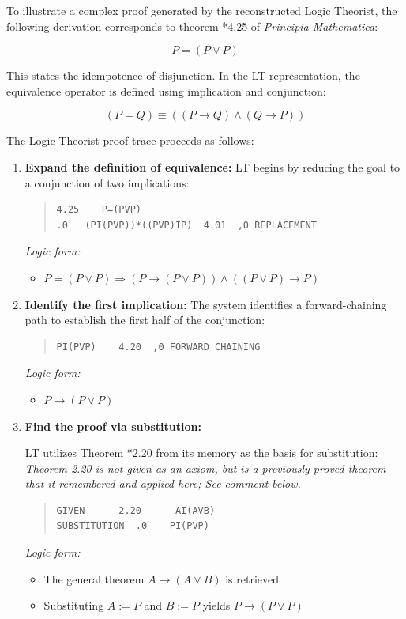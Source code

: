 \documentclass[journal]{IEEEtran}
\begin{document}
To illustrate a complex proof generated by the reconstructed Logic
Theorist, the following derivation corresponds to theorem *4.25 of
\textit{Principia Mathematica}:

\[ P = (P \lor P) \]

This states the idempotence of disjunction. In the LT representation,
the equivalence operator is defined using implication and conjunction:

\[ (P = Q) \equiv ((P \rightarrow Q) \land (Q \rightarrow P)) \]

The Logic Theorist proof trace proceeds as follows:

\begin{enumerate}

\item \textbf{Expand the definition of equivalence:}
LT begins by reducing the goal to a conjunction of two implications:
\begin{quote}
\begin{verbatim}
4.25    P=(PVP)
.0   (PI(PVP))*((PVP)IP)  4.01  ,0 REPLACEMENT
\end{verbatim}
\end{quote}
\textit{Logic form:}
\begin{itemize}
    \item[] $P = (P \lor P) \Rightarrow (P \rightarrow (P \lor P)) \land ((P \lor P) \rightarrow P)$ 
\end{itemize}

\item \textbf{Identify the first implication:}
The system identifies a forward-chaining path to establish the first half of the conjunction:
\begin{quote}
\begin{verbatim}
PI(PVP)    4.20  ,0 FORWARD CHAINING
\end{verbatim}
\end{quote}
\textit{Logic form:} 
\begin{itemize}
    \item[] $P \rightarrow (P \lor P)$
\end{itemize}

\item \textbf{Find the proof via substitution:}

LT utilizes Theorem *2.20 from its memory as the basis for
substitution: \textit{Theorem 2.20 is not given as an axiom, but is a
previously proved theorem that it remembered and applied here; See
comment below.}

\begin{quote}
\begin{verbatim}
GIVEN      2.20      AI(AVB)
SUBSTITUTION  .0    PI(PVP)
\end{verbatim}
\end{quote}
\textit{Logic form:} 
\begin{itemize}
    \item[] The general theorem $A \rightarrow (A \lor B)$ is retrieved
    \item[] Substituting $A := P$ and $B := P$ yields $P \rightarrow (P \lor P)$
\end{itemize}


\end{enumerate}
\end{document}
